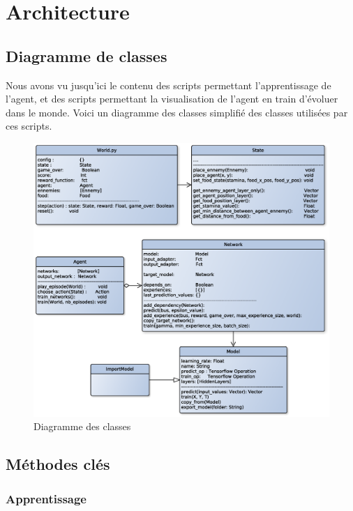 \documentclass[11pt,a4paper]{report}
\begin{document}
  \section{Architecture}
  
  \subsection{Diagramme de classes}
  
  \par Nous avons vu jusqu'ici le contenu des scripts permettant l'apprentissage de l'agent, et des scripts permettant la visualisation de l'agent en train d'évoluer dans le monde. Voici un diagramme des classes simplifié des classes utilisées par ces scripts. 
  
  \begin{figure}[!h]
  \center
  \includegraphics[scale=0.6]{ressources/class_diagram.eps}
  \caption{Diagramme des classes}
  \end{figure} 
  
  \subsection{Méthodes clés}
  
  \subsubsection{Apprentissage}
  
\end{document}
